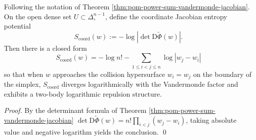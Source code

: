 
\begin{corollary}\label{cor:pom-power-sum-jacobian-entropy}
Following the notation of Theorem \ref{thm:pom-power-sum-vandermonde-jacobian}.
On the open dense set \(U\subset\Delta_{\circ}^{n-1}\), define the coordinate Jacobian entropy potential
\[
S_{\mathrm{coord}}(w):=-\log\left|\det \mathrm{D}\widetilde\Phi(w)\right|.
\]
Then there is a closed form
\[
\boxed{\;
S_{\mathrm{coord}}(w)
=-\log n!
-\sum_{1\le i<j\le n}\log|w_j-w_i|\;}
\]
so that when \(w\) approaches the collision hypersurface \(w_i=w_j\) on the boundary of the simplex,
\(S_{\mathrm{coord}}\) diverges logarithmically with the Vandermonde factor and exhibits a two-body logarithmic repulsion structure.
\end{corollary}
\begin{proof}
By the determinant formula of Theorem \ref{thm:pom-power-sum-vandermonde-jacobian}
\(
\det \mathrm{D}\widetilde\Phi(w)=n!\prod_{i<j}(w_j-w_i)
\),
taking absolute value and negative logarithm yields the conclusion. \qed
\end{proof}
